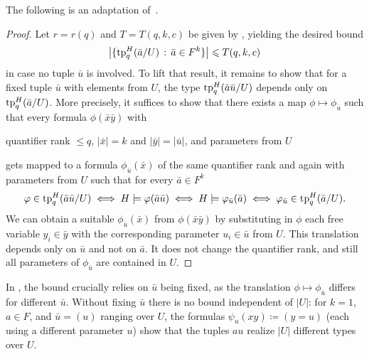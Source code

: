 The following is an adaptation of~\cite[Corollary~16]{number-of-types}. 
\septypestuples*
\begin{proof}
  Let $r=r(q)$ and $T=T(q,k,c)$ be given by ,
  yielding the desired bound
  \[
  \left|
    \{
    \textnormal{tp}_q^H(\bar a/U) \,:\, \bar a \in F^k  
    \}
  \right|
  \leqslant
  T(q,k,c)
  \]
  in case no tuple $\bar u$ is involved.
  To lift that result, it remains to show that for a fixed tuple $\bar u$ with elements from $U$, the type 
  $\textnormal{tp}^H_q(\bar a\bar u/U)$ depends only on $\textnormal{tp}^H_q(\bar a/U)$.
  More precisely, it suffices to show that there exists a map $\phi \mapsto \phi_{\bar u}$ such that every formula
  $\phi(\bar x \bar y)$ with 

  \begin{center}
    quantifier rank ${\leq}q$,
    \qquad
    $|\bar x| = k$ and $|\bar y| = |\bar u|$, 
    \qquad
    and parameters from $U$
  \end{center}
  gets mapped to a formula $\phi_{\bar u}(\bar x)$ of the same quantifier rank and again with parameters from $U$ such that 
  for every $\bar a \in F^k$
  \[
    \varphi\in\textnormal{tp}^H_q(\bar a\bar u/U)
    \iff H\models\varphi(\bar a\bar u)
    \iff H\models\varphi_{\bar u}(\bar a)
    \iff \varphi_{\bar u}\in\textnormal{tp}^H_q(\bar a/U).
  \]
  We can obtain a suitable $\phi_{\bar u}(\bar x)$ from $\phi(\bar x \bar y)$ by substituting in $\phi$ each free variable $y_i \in \bar y$ with the corresponding parameter $u_i \in \bar u$ from $U$.
  This translation depends only on $\bar u$ and not on $\bar a$. 
  It does not change the quantifier rank, and still all parameters of $\phi_{\bar u}$ are contained in $U$.
\end{proof}
\begin{remark}
  In ,
  the bound crucially relies on $\bar u$ being fixed, as the translation $\phi\mapsto\phi_{\bar u}$ differs for different $\bar u$.
  Without fixing $\bar u$ there is no bound independent of $|U|$:
  for $k=1$, $a\in F$, and $\bar u=(u)$ ranging over $U$, the formulas $\psi_u(xy) \coloneqq (y=u)$ (each using a different parameter $u$) show that the tuples $au$ realize $|U|$ different types over $U$.
\end{remark}
